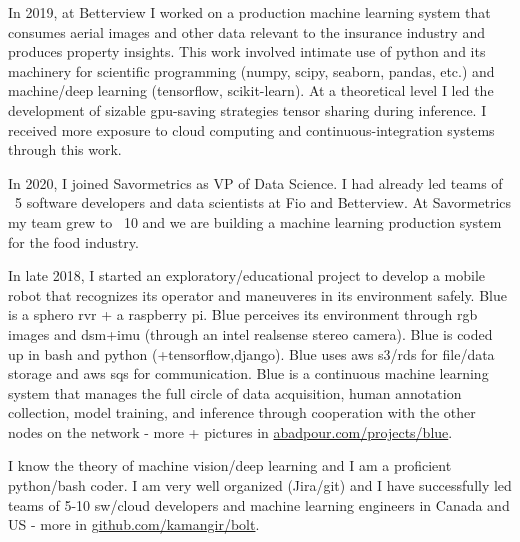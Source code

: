 \osspacing
In 2019, at Betterview I worked on a production machine learning system that consumes aerial images and other data relevant to the insurance industry and produces property insights. This work involved intimate use of python and its machinery for scientific programming (numpy, scipy, seaborn, pandas, etc.) and machine/deep learning (tensorflow, scikit-learn). At a theoretical level I led the development of sizable gpu-saving strategies tensor sharing during inference. I received more exposure to cloud computing and continuous-integration systems through this work.

\osspacing
In 2020, I joined Savormetrics as VP of Data Science. I had already led teams of ~5 software developers and data scientists at Fio and Betterview. At Savormetrics my team grew to ~10 and we are building a machine learning production system for the food industry.

\osspacing
In late 2018, I started an exploratory/educational project to develop a mobile robot that recognizes its operator and maneuveres in its environment safely. Blue is a sphero rvr + a raspberry pi. Blue perceives its environment through rgb images and dsm+imu (through an intel realsense stereo camera). Blue is coded up in bash and python (+tensorflow,django). Blue uses aws s3/rds for file/data storage and aws sqs for communication. Blue is a continuous machine learning system that manages the full circle of data acquisition, human annotation collection, model training, and inference through cooperation with the other nodes on the network - more + pictures in \href{http://abadpour.com/projects/blue}{abadpour.com/projects/blue}.

\osspacing
I know the theory of machine vision/deep learning and I am a proficient python/bash coder. I am very well organized (Jira/git) and I have successfully led teams of 5-10 sw/cloud developers and machine learning engineers in Canada and US - more in \href{https://github.com/kamangir/bolt}{github.com/kamangir/bolt}.

